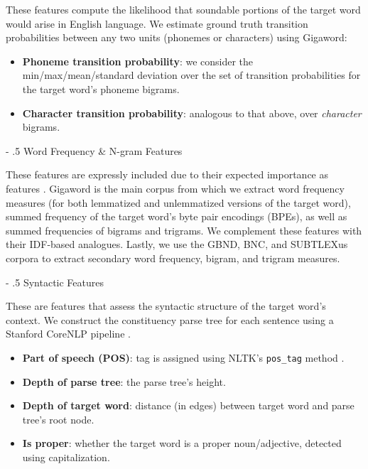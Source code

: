 \documentclass[11pt,a4paper]{article}
\makeatletter
\renewcommand\paragraph{%
    \@startsection{paragraph}{4}{0mm}%
        {-\baselineskip}%
        {.5\baselineskip}%
        {\normalfont\normalsize\bfseries}}
\makeatother
\begin{document}
These features compute the likelihood that soundable portions of the target word would arise in English language. We estimate ground truth transition probabilities between any two units (phonemes or characters) using Gigaword:

\begin{itemize}
  \item \textbf{Phoneme transition probability}: we consider the min/max/mean/standard deviation over the set of transition probabilities for the target word's phoneme bigrams.
  \item \textbf{Character transition probability}: analogous to that above, over \textit{character} bigrams.
\end{itemize}

\paragraph{Word Frequency \& N-gram Features}

These features are expressly included due to their expected importance as features \citep{zampieri2017complex}. Gigaword is the main corpus from which we extract word frequency measures (for both lemmatized and unlemmatized versions of the target word), summed frequency of the target word's byte pair encodings (BPEs), as well as summed frequencies of bigrams and trigrams. We complement these features with their IDF-based analogues. Lastly, we use the GBND, BNC, and SUBTLEXus corpora to extract secondary word frequency, bigram, and trigram measures. 

\paragraph{Syntactic Features}

These are features that assess the syntactic structure of the target word's context. We construct the constituency parse tree for each sentence using a Stanford CoreNLP pipeline \citep{manning2014stanford}.

\begin{itemize}
  \item \textbf{Part of speech (POS)}: tag is assigned using NLTK's \texttt{pos\_tag} method \citep{bird2009natural}.
  \item \textbf{Depth of parse tree}: the parse tree's height.
  \item \textbf{Depth of target word}: distance (in edges) between target word and parse tree's root node.
  \item \textbf{Is proper}: whether the target word is a proper noun/adjective, detected using capitalization.
\end{itemize}
\end{document}
